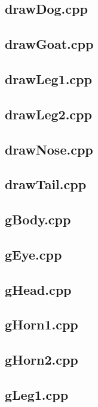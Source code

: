 \documentclass{article}
\begin{document}
\newpage\subsection{drawDog.cpp}
\newpage\subsection{drawGoat.cpp}
\newpage\subsection{drawLeg1.cpp}
\newpage\subsection{drawLeg2.cpp}
\newpage\subsection{drawNose.cpp}
\newpage\subsection{drawTail.cpp}
\newpage\subsection{gBody.cpp}
\newpage\subsection{gEye.cpp}
\newpage\subsection{gHead.cpp}
\newpage\subsection{gHorn1.cpp}
\newpage\subsection{gHorn2.cpp}
\newpage\subsection{gLeg1.cpp}
\end{document}
